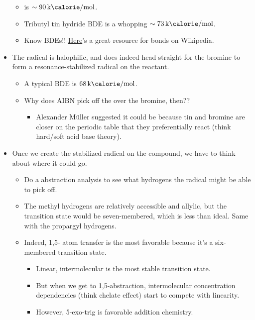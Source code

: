 \documentclass[../notes.tex]{subfiles}
\begin{document}
\begin{itemize}
\begin{itemize}
        \item {} is $\sim\SI{90}{\kilo\calorie\per\mole}$.
        \item Tributyl tin hydride BDE is a whopping $\sim\SI{73}{\kilo\calorie\per\mole}$.
        \item Know BDEs!! \href{https://en.wikipedia.org/wiki/Carbon%E2%80%93hydrogen_bond#Reactions}{Here}'s a great resource for \ce{C-H} bonds on Wikipedia.
    \end{itemize}
    \item The  radical is halophilic, and does indeed head straight for the bromine to form a resonance-stabilized radical on the reactant.
    \begin{itemize}
        \item A typical  BDE is $\SI{68}{\kilo\calorie\per\mole}$.
        \item Why does AIBN pick off the  over the bromine, then??
        \begin{itemize}
            \item Alexander M\"{u}ller suggested it could be because tin and bromine are closer on the periodic table that they preferentially react (think hard/soft acid base theory).
        \end{itemize}
    \end{itemize}
    \item Once we create the stabilized radical on the compound, we have to think about where it could go.
    \begin{itemize}
        \item Do a  abstraction analysis to see what hydrogens the radical might be able to pick off.
        \item The methyl hydrogens are relatively accessible and allylic, but the transition state would be seven-membered, which is less than ideal. Same with the propargyl hydrogens.
        \item Indeed, 1,5- atom transfer is the most favorable because it's a six-membered transition state.
        \begin{itemize}
            \item Linear, intermolecular is the most stable transition state.
            \item But when we get to 1,5-abstraction, intermolecular concentration dependencies (think chelate effect) start to compete with linearity.
            \item However, 5-exo-trig is favorable addition chemistry.

\end{itemize}
\end{itemize}
\end{itemize}
\end{document}
